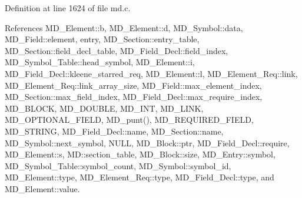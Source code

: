 Definition at line 1624 of file md.c.

References MD\_\-Element::b, MD\_\-Element::d, MD\_\-Symbol::data, MD\_\-Field::element, entry, MD\_\-Section::entry\_\-table, MD\_\-Section::field\_\-decl\_\-table, MD\_\-Field\_\-Decl::field\_\-index, MD\_\-Symbol\_\-Table::head\_\-symbol, MD\_\-Element::i, MD\_\-Field\_\-Decl::kleene\_\-starred\_\-req, MD\_\-Element::l, MD\_\-Element\_\-Req::link, MD\_\-Element\_\-Req::link\_\-array\_\-size, MD\_\-Field::max\_\-element\_\-index, MD\_\-Section::max\_\-field\_\-index, MD\_\-Field\_\-Decl::max\_\-require\_\-index, MD\_\-BLOCK, MD\_\-DOUBLE, MD\_\-INT, MD\_\-LINK, MD\_\-OPTIONAL\_\-FIELD, MD\_\-punt(), MD\_\-REQUIRED\_\-FIELD, MD\_\-STRING, MD\_\-Field\_\-Decl::name, MD\_\-Section::name, MD\_\-Symbol::next\_\-symbol, NULL, MD\_\-Block::ptr, MD\_\-Field\_\-Decl::require, MD\_\-Element::s, MD::section\_\-table, MD\_\-Block::size, MD\_\-Entry::symbol, MD\_\-Symbol\_\-Table::symbol\_\-count, MD\_\-Symbol::symbol\_\-id, MD\_\-Element::type, MD\_\-Element\_\-Req::type, MD\_\-Field\_\-Decl::type, and MD\_\-Element::value.